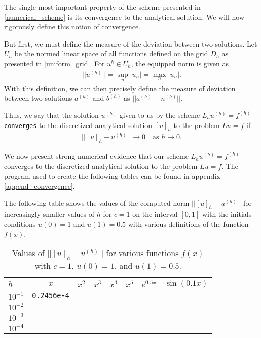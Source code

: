The single most important property of the scheme presented in
\eqref{numerical_scheme} is its convergence to the analytical solution. We will
now rigorously define this notion of convergence.

But first, we must define the measure of the deviation between two solutions.
Let $U_h$ be the normed linear space of all functions defined on the grid $D_h$
as presented in \eqref{uniform_grid}. For $u^{h} \in U_h$, the equipped norm is
given as
\begin{align}\label{norm}
  ||u^{(h)}|| = \sup_n |u_n| = \max_n |u_n|.
\end{align}
With this definition, we can then precisely define the measure of deviation
between two solutions $a^{(h)}$ and $b^{(h)}$ as $||a^{(h)} - n^{(h)}||$.

Thus, we say that the solution $u^{(h)}$ given to us by the
scheme $L_h u^{(h)} = f^{(h)}$ \texttt{converges} to the discretized analytical
solution $[u]_h$ to the problem $Lu = f$ if
\begin{align}\label{convergence_def}
  ||[u]_h - u^{(h)}|| \to 0 \quad \text{as $h \to 0$}.
\end{align}

We now present strong numerical evidence that our scheme $L_h u^{(h)} = f^{(h)}$
converges to the discretized analytical solution to the problem $Lu = f$. The
program used to create the following tables can be found in appendix \ref{append_convergence}.

The following table shows the values of the computed norm $||[u]_h - u^{(h)}||$ for
increasingly smaller values of $h$ for $c=1$ on the interval $[0, 1]$ with the
initials conditions $u(0) = 1$ and $u(1) = 0.5$ with various definitions of
the function $f(x)$.

\begin{table}[h!]
  \centering
  \bgroup
  \def\arraystretch{1.5}
  \begin{tabular}{| l | c | c | c | c | c | c | c |}
    \hline
    $h$ & $x$ & $x^2$ & $x^3$ & $x^4$ & $x^5$ & $e^{0.5x}$ & $\sin(0.1 x)$\\
    \hline
    $10^{-1}$ & \texttt{0.2456e-4} & & & & & & \\
    $10^{-2}$ & & & & & & & \\
    $10^{-3}$ & & & & & & & \\
    $10^{-4}$ & & & & & & & \\
    \hline
  \end{tabular}
  \egroup
  \caption{Values of $||[u]_h - u^{(h)}||$ for various functions $f(x)$ with $c = 1$, $u(0) = 1$, and $u(1) = 0.5$.}
\end{table}

